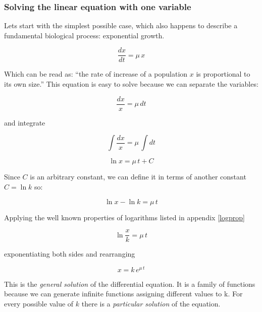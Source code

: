 \documentclass[12pt]{article}
\begin{document}
\subsubsection{Solving the linear equation with one variable}

Lets start with the simplest possible case, which also happens to describe a fundamental biological process: exponential growth.

\begin{equation}
	\label{odexp}
	\frac{dx}{dt} = \mu \, x 
\end{equation}

Which can be read as: ``the rate of increase of a population $x$ is proportional to its own size.'' This equation is easy to solve because we can separate the variables:


\begin{equation}
	\frac{dx}{x} = \mu \, dt \nonumber
\end{equation}

and integrate

\begin{equation}
	\int \frac{dx}{x} = \mu \, \int  dt \nonumber
\end{equation}

\begin{equation}
	\ln{x} = \mu \, t + C \nonumber
\end{equation}

Since $C$ is an arbitrary constant, we can define it in terms of another constant $C= \ln{k}$ so:

\begin{equation}
	\ln{x} - \ln{k}  = \mu \, t  \nonumber
\end{equation}

Applying the well known properties of logarithms listed in appendix \ref{logprop}

\begin{equation}
	\ln{\frac{x}{k}}   = \mu \, t \nonumber
\end{equation}

exponentiating both sides and rearranging

\begin{equation}
	x   = k \, e^{\mu \, t} \nonumber
\end{equation}

This is the \emph{general solution} of the differential equation. It is a family of functions because we can generate infinite functions assigning different values to k. For every possible value of $k$ there is a \emph{particular solution} of the equation.
\end{document}
